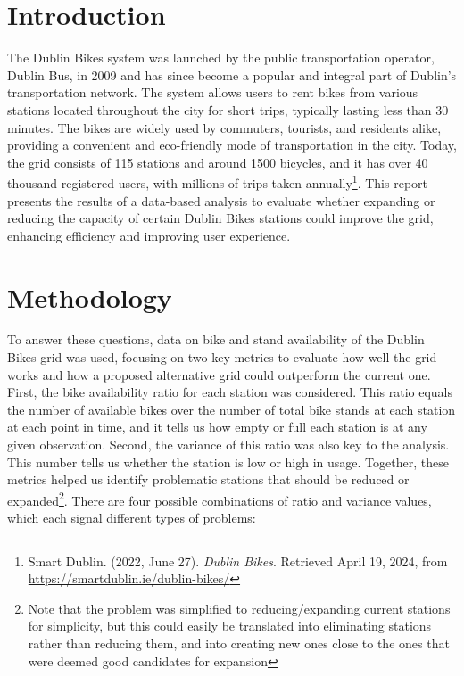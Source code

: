 \vspace{-0.5cm}
\section{Introduction}
\vspace{-0.5cm}

The Dublin Bikes system was launched by the public transportation operator, Dublin Bus, in 2009 and has since become a popular and integral part of Dublin's transportation network. The system allows users to rent bikes from various stations located throughout the city for short trips, typically lasting less than 30 minutes. The bikes are widely used by commuters, tourists, and residents alike, providing a convenient and eco-friendly mode of transportation in the city. Today, the grid consists of 115 stations and around 1500 bicycles, and it has over 40 thousand registered users, with millions of trips taken annually\footnote{Smart Dublin. (2022, June 27). \textit{Dublin Bikes}. Retrieved April 19, 2024, from \url{https://smartdublin.ie/dublin-bikes/}}. This report presents the results of a data-based analysis to evaluate whether expanding or reducing the capacity of certain Dublin Bikes stations could improve the grid, enhancing efficiency and improving user experience.

\vspace{-0.5cm}
\section{Methodology}
\vspace{-0.5cm}

\vspace{0.3cm}
\noindent
To answer these questions, data on bike and stand availability of the Dublin Bikes grid was used, focusing on two key metrics to evaluate how well the grid works and how a proposed alternative grid could outperform the current one. First, the bike availability ratio for each station was considered. This ratio equals the number of available bikes over the number of total bike stands at each station at each point in time, and it tells us how empty or full each station is at any given observation. Second, the variance of this ratio was also key to the analysis. This number tells us whether the station is low or high in usage. Together, these metrics helped us identify problematic stations that should be reduced or expanded\footnote{Note that the problem was simplified to reducing/expanding current stations for simplicity, but this could easily be translated into eliminating stations rather than reducing them, and into creating new ones close to the ones that were deemed good candidates for expansion}. There are four possible combinations of ratio and variance values, which each signal different types of problems: 

